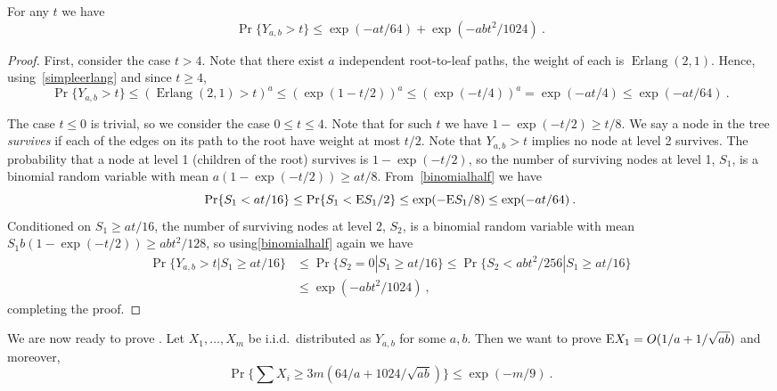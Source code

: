 \documentclass{patmorin}
\DeclareMathOperator{\erlang}{Erlang}
\begin{document}
\begin{lem}
\label{lem:yabconc}
For any $t$ we have
\[
\Pr\{Y_{a,b}>t\} \leq \exp(-at/64)+\exp(-abt^2/1024)\:.
\]
\end{lem}
\begin{proof}
First, consider the case $t>4$.
Note that there exist $a$ independent root-to-leaf paths, the weight of each is $\erlang(2,1)$.
Hence, using~\eqref{simpleerlang} and since $t\geq4$,
\[
\Pr\{Y_{a,b}>t\}
\leq
\left(\erlang(2,1)>t\right)^a
\leq
(\exp(1-t/2))^a
\leq
(\exp(-t/4))^a
=\exp(-at/4)
\leq\exp(-at/64)\:.
\]

The case $t\leq 0$ is trivial, so we consider the case $0\leq t\leq 4$.
Note that for such $t$ we have $1-\exp(-t/2)\geq t/8$.
We say a node in the tree \emph{survives} if each of the edges on its path to the root
have weight at most $t/2$.
Note that $Y_{a,b}>t$ implies no node at level 2 survives.
The probability that a node at level 1 (children of the root) survives is $1-\exp(-t/2)$,
so the number of surviving nodes at level 1, $S_1$, is a binomial random variable with mean $a(1-\exp(-t/2))\geq at/8$.
From~\eqref{binomialhalf} we have
\[
\Pr\{S_1 < at/16\}
\leq
\Pr\{S_1 < \mathrm{E} S_1 / 2\}
\leq
\exp(-\mathrm{E} S_1/8)
\leq 
\exp(-at/64)\:.
\]
Conditioned on $S_1\geq at/16$, the number of surviving nodes at level 2, $S_2$, is a binomial random variable with mean
$S_1b(1-\exp(-t/2))\geq abt^2/128$, so using\eqref{binomialhalf} again we have
\begin{align*}
\Pr\{Y_{a,b}>t | S_1\geq at/16\}
& \leq
\Pr\{S_2=0 | S_1\geq at/16\}
\leq
\Pr\{S_2<abt^2/256 | S_1\geq at/16\} \\
& \leq
\exp(-abt^2/1024)\:,
\end{align*}
completing the proof.
\end{proof}

We are now ready to prove
.
Let $X_1,\dots,X_m$ be i.i.d.\ distributed as $Y_{a,b}$ for some $a,b$.
Then we want to prove
$\mathrm{E} X_1 =O(1/a+1/\sqrt{ab})$ and moreover,
\[
\Pr\{\sum X_i \geq 3 m (64/a + 1024/\sqrt{ab}) \}
\leq
\exp(-m/9)\:.
\]
\end{document}
